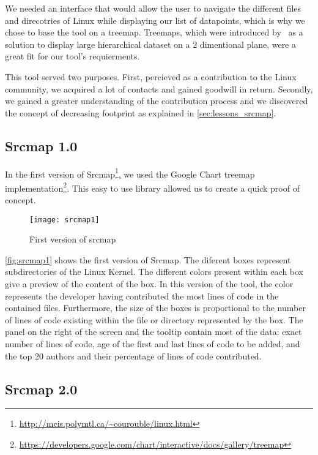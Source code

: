 We needed an interface that would allow the user to navigate the different files and direcotries of Linux while displaying our list of datapoints, which is why we chose to base the tool on a treemap. Treemaps, which were introduced by~\citep{Bederson-2002} as a solution to display large hierarchical dataset on a 2 dimentional plane, were a great fit for our tool's requierments. 

This tool served two purposes. First, percieved as a contribution to the Linux community, we acquired a lot of contacts and gained goodwill in return. Secondly, we gained a greater understanding of the contribution process and we discovered the concept of decreasing footprint as explained in \autoref{sec:lessons_srcmap}.

\subsection{Srcmap 1.0}

In the first version of Srcmap\footnote{\url{http://mcis.polymtl.ca/~courouble/linux.html}}, we used the Google Chart treemap implementation\footnote{\url{https://developers.google.com/chart/interactive/docs/gallery/treemap}}. This easy to use library allowed us to create a quick proof of concept. 

\begin{figure}[htb]
\centering
\texttt{[image: srcmap1]}
\caption{First version of srcmap}
\label{fig:srcmap1}
\end{figure}

\autoref{fig:srcmap1} shows the first version of Srcmap. The diferent boxes represent subdirectories of the Linux Kernel. The different colors present within each box give a preview of the content of the box. In this version of the tool, the color represents the developer having contributed the most lines of code in the contained files. Furthermore, the size of the boxes is proportional to the number of lines of code existing within the file or directory represented by the box. The panel on the right of the screen and the tooltip contain most of the data: exact number of lines of code, age of the first and last lines of code to be added, and the top 20 authors and their percentage of lines of code contributed.


\subsection{Srcmap 2.0}


